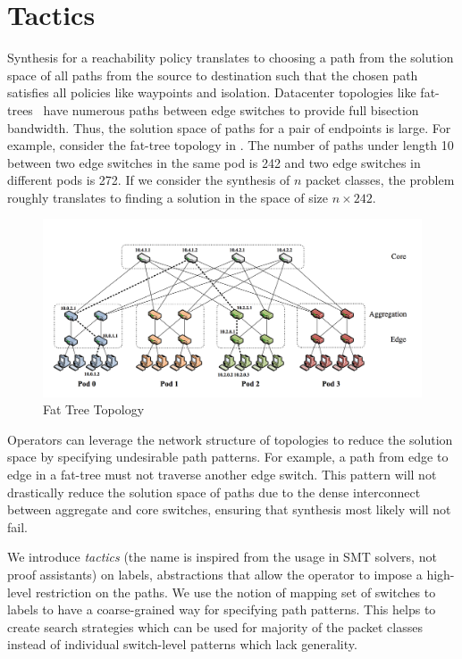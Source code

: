 \section{Tactics} \label{sec:tactic}
Synthesis for a reachability policy translates to choosing a path from the 
solution space of all paths from the source to destination such that the 
chosen path satisfies all policies like waypoints and isolation. Datacenter 
topologies like fat-trees~\cite{fattree} have numerous paths between 
edge switches to provide full bisection bandwidth. 
Thus, the solution space of paths for a pair of endpoints is large. 
For example, consider the fat-tree topology in . 
The number of paths under length 10 between two edge  switches 
in the same pod is 242 and two edge switches in different pods is 272. 
If we consider the synthesis of $n$ packet classes, the problem 
roughly translates to finding a solution in the space of size $n \times 242$.
\begin{figure}[h]
	\includegraphics[width=\columnwidth]{figures/fattree.png}
	\caption{Fat Tree Topology}
	\label{fig:fattree}
\end{figure}
Operators can leverage the network structure of topologies
 to reduce the solution space by specifying undesirable path patterns. 
 For example, a path from edge to edge in a fat-tree must not traverse another edge switch.
 This pattern will not drastically reduce the solution space of paths 
 due to the dense interconnect between aggregate and core switches,
 ensuring that synthesis most likely will not fail. 

We introduce \emph{tactics} (the name is inspired from the usage in SMT solvers, not 
proof assistants)
on labels, abstractions that allow the 
operator to impose a high-level restriction on the paths. 
We use the notion of mapping set of switches to labels to 
have a coarse-grained way for specifying path patterns. This helps
to create search strategies which can be used for majority 
of the packet classes instead of individual switch-level patterns which
lack generality.


